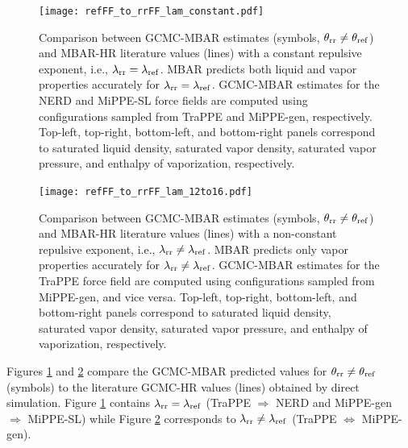 \documentclass[journal=jced,manuscript=article]{achemso}
\begin{document}

	\begin{figure}[H]
		\centering
		\texttt{[image: refFF\_to\_rrFF\_lam\_constant.pdf]}
		\caption{Comparison between GCMC-MBAR estimates (symbols, $\theta_{\rm rr} \neq \theta_{\rm ref}$) and MBAR-HR literature values\cite{Potoff_branched} (lines) with a constant repulsive exponent, i.e., $\lambda_{\rm rr} = \lambda_{\rm ref}$. MBAR predicts both liquid and vapor properties accurately for $\lambda_{\rm rr} = \lambda_{\rm ref}$. GCMC-MBAR estimates for the NERD and MiPPE-SL force fields are computed using configurations sampled from TraPPE and MiPPE-gen, respectively. Top-left, top-right, bottom-left, and bottom-right panels correspond to saturated liquid density, saturated vapor density, saturated vapor pressure, and enthalpy of vaporization, respectively.}
		\label{fig:refFF_to_rrFF_lam_constant}
	\end{figure}
	
	\begin{figure}[H]
		\centering
		\texttt{[image: refFF\_to\_rrFF\_lam\_12to16.pdf]}
		\caption{Comparison between GCMC-MBAR estimates (symbols, $\theta_{\rm rr} \neq \theta_{\rm ref}$) and MBAR-HR literature values\cite{Potoff_branched} (lines) with a non-constant repulsive exponent, i.e., $\lambda_{\rm rr} \neq \lambda_{\rm ref}$. MBAR predicts only vapor properties accurately for $\lambda_{\rm rr} \neq \lambda_{\rm ref}$. GCMC-MBAR estimates for the TraPPE force field are computed using configurations sampled from MiPPE-gen, and vice versa. Top-left, top-right, bottom-left, and bottom-right panels correspond to saturated liquid density, saturated vapor density, saturated vapor pressure, and enthalpy of vaporization, respectively.}
		\label{fig:refFF_to_rrFF_lam12to16}
	\end{figure}

Figures \ref{fig:refFF_to_rrFF_lam_constant} and \ref{fig:refFF_to_rrFF_lam12to16} compare the GCMC-MBAR predicted values for $\theta_{\rm rr} \neq \theta_{\rm ref}$ (symbols) to the literature GCMC-HR values (lines) obtained by direct simulation. Figure \ref{fig:refFF_to_rrFF_lam_constant} contains $\lambda_{\rm rr} = \lambda_{\rm ref}$ (TraPPE $\Rightarrow$ NERD and MiPPE-gen $\Rightarrow$ MiPPE-SL) while Figure \ref{fig:refFF_to_rrFF_lam12to16} corresponds to $\lambda_{\rm rr} \neq \lambda_{\rm ref}$ (TraPPE $\Leftrightarrow$ MiPPE-gen). 
\end{document}
